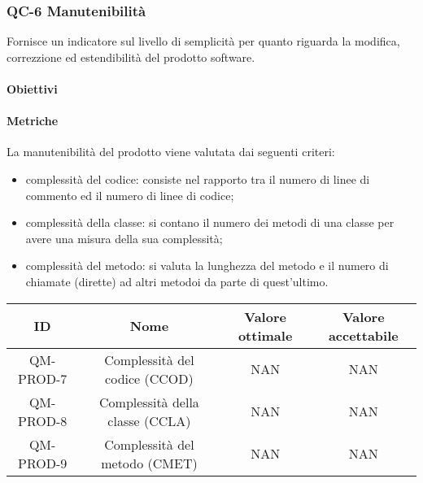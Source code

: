 \subsubsection{QC-6 Manutenibilità}
Fornisce un indicatore sul livello di semplicità per quanto riguarda la modifica, correzzione ed estendibilità del prodotto software.
	\paragraph{Obiettivi}
		
	\paragraph{Metriche}
	La manutenibilità del prodotto viene valutata dai seguenti criteri:
	\begin{itemize}
		\item complessità del codice: consiste nel rapporto tra il numero di linee di commento ed il numero di linee di codice;
		\item complessità della classe: si contano il numero dei metodi di una classe per avere una misura della sua complessità;
		\item complessità del metodo: si valuta la lunghezza del metodo e il numero di chiamate (dirette) ad altri metodoi da parte di quest'ultimo.
	\end{itemize}
	\begin{center}
		\begin{tabular}{|c|c|c|c|}
			\rowcolor{lighter-grayer}
			\hline
			ID & Nome & Valore ottimale & Valore accettabile \\
			\hline
			QM-PROD-7 & Complessità del codice (CCOD) & NAN & NAN \\
			\hline
			QM-PROD-8 & Complessità della classe (CCLA) & NAN & NAN \\
			\hline
			QM-PROD-9 & Complessità del metodo (CMET) & NAN & NAN \\
			\hline
		\end{tabular}
	\end{center}
